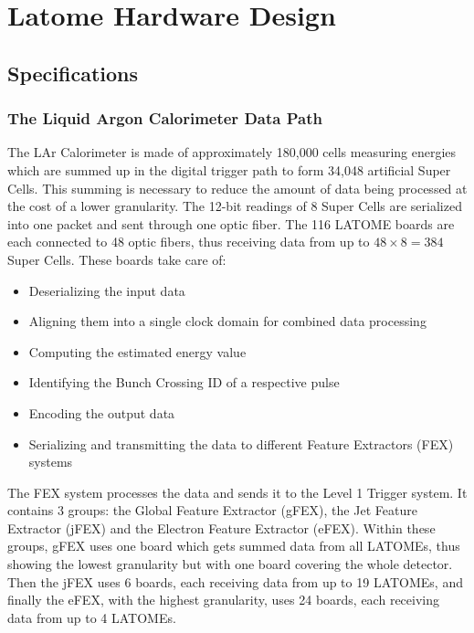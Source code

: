 \chapter{Latome Hardware Design}\label{ch:latome-firmware}

\section{Specifications}\label{sec:specifications}
\subsection{The Liquid Argon Calorimeter Data Path}\label{sec:lar}
The LAr Calorimeter is made of approximately 180,000 cells measuring energies which are summed up in the digital trigger path to form 34,048 artificial Super Cells. This summing is necessary to reduce the amount of data being processed at the cost of a lower granularity. The 12-bit readings of 8 Super Cells are serialized into one packet and sent through one optic fiber. The 116 LATOME boards are each connected to 48 optic fibers, thus receiving data from up to \(48\times8=384\) Super Cells. These boards take care of:

\begin{itemize}
    \item Deserializing the input data
    \item Aligning them into a single clock domain for combined data processing
    \item Computing the estimated energy value
    \item Identifying the Bunch Crossing ID of a respective pulse
    \item Encoding the output data
    \item Serializing and transmitting the data to different Feature Extractors (FEX) systems
\end{itemize}

The FEX system processes the data and sends it to the Level 1 Trigger system. It contains 3 groups: the Global Feature Extractor (gFEX), the Jet Feature Extractor (jFEX) and the Electron Feature Extractor (eFEX). Within these groups, gFEX uses one board which gets summed data from all LATOMEs, thus showing the lowest granularity but with one board covering the whole detector. Then the jFEX uses 6 boards, each receiving data from up to 19 LATOMEs, and finally the eFEX, with the highest granularity, uses 24 boards, each receiving data from up to 4 LATOMEs.


